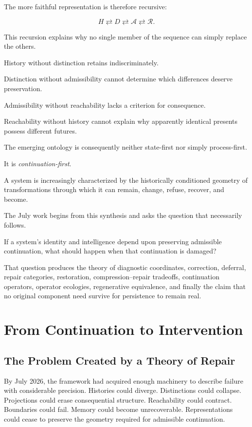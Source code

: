 \documentclass[11pt]{article}
\theoremstyle{remark}
\newcommand{\Adm}{\mathcal{A}}
\newcommand{\Reach}{\mathcal{R}}
\begin{document}
The more faithful representation is therefore recursive:

\begin{equation}
\boxed{
H
\rightleftarrows
D
\rightleftarrows
\Adm
\rightleftarrows
\Reach.
}
\end{equation}

This recursion explains why no single member of the sequence can simply replace the others.

History without distinction retains indiscriminately.

Distinction without admissibility cannot determine which differences deserve preservation.

Admissibility without reachability lacks a criterion for consequence.

Reachability without history cannot explain why apparently identical presents possess different futures.

The emerging ontology is consequently neither state-first nor simply process-first.

It is \emph{continuation-first}.

A system is increasingly characterized by the historically conditioned geometry of transformations through which it can remain, change, refuse, recover, and become.

The July work begins from this synthesis and asks the question that necessarily follows.

If a system's identity and intelligence depend upon preserving admissible continuation, what should happen when that continuation is damaged?

That question produces the theory of diagnostic coordinates, correction, deferral, repair categories, restoration, compression--repair tradeoffs, continuation operators, operator ecologies, regenerative equivalence, and finally the claim that no original component need survive for persistence to remain real.

\section{From Continuation to Intervention}

\subsection{The Problem Created by a Theory of Repair}

By July 2026, the framework had acquired enough machinery to describe failure with considerable precision. Histories could diverge. Distinctions could collapse. Projections could erase consequential structure. Reachability could contract. Boundaries could fail. Memory could become unrecoverable. Representations could cease to preserve the geometry required for admissible continuation.
\end{document}
